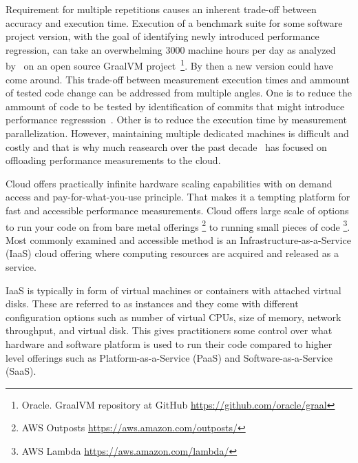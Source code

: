 Requirement for multiple repetitions causes an inherent trade-off between accuracy and execution time.
Execution of a benchmark suite for some software project version, with the goal of identifying newly introduced performance regression, can take an overwhelming 3000 machine hours per day as analyzed by~\citet{bulej2020duet} on an open source GraalVM project~\footnote{Oracle. GraalVM repository at GitHub \url{https://github.com/oracle/graal}}.
By then a new version could have come around.
This trade-off between measurement execution times and ammount of tested code change can be addressed from multiple angles.
One is to reduce the ammount of code to be tested by identification of commits that might introduce performance regresssion~\citet{oliveira2017perphecy}.
Other is to reduce the execution time by measurement parallelization.
However, maintaining multiple dedicated machines is difficult and costly  and that is why much reasearch over the past decade~\cite{leitner2016patterns, laaber2019software, abedi2017conducting} has focused on offloading performance measurements to the cloud.

Cloud offers practically infinite hardware scaling capabilities with on demand access and pay-for-what-you-use principle.
That makes it a tempting platform for fast and accessible performance measurements.
Cloud offers large scale of options to run your code on from bare metal offerings \footnote{AWS Outposts \url{https://aws.amazon.com/outposts/}} to running small pieces of code \footnote{AWS Lambda \url{https://aws.amazon.com/lambda/}}.
Most commonly examined and accessible method is an Infrastructure-as-a-Service (IaaS) cloud offering where computing resources are acquired and released as a service.

IaaS is typically in form of virtual machines or containers with attached virtual disks.
These are referred to as instances and they come with different configuration options such as number of virtual CPUs, size of memory, network throughput, and virtual disk.
This gives practitioners some control over what hardware and software platform is used to run their code compared to higher level offerings such as Platform-as-a-Service (PaaS) and Software-as-a-Service (SaaS).

